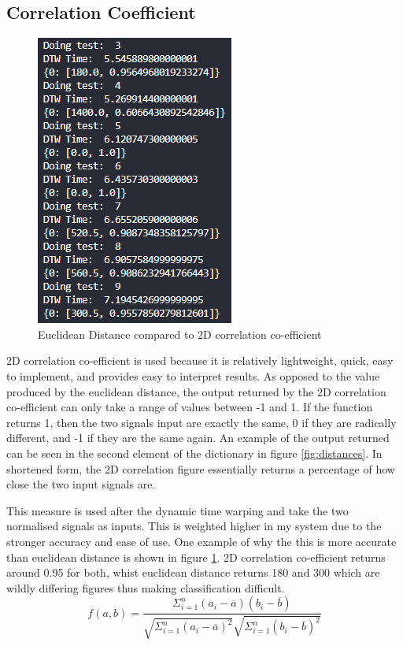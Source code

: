 \documentclass[10pt,a4paper]{report}
\begin{document}
\subsection{Correlation Coefficient}

\begin{figure}
	\centering
	\includegraphics[scale=0.5]{EucVs2D}
	\caption{Euclidean Distance compared to 2D correlation co-efficient}
	\label{fig:VCompare}
\end{figure}

2D correlation co-efficient is used because it is relatively lightweight, quick, easy to implement, and provides easy to interpret results. As opposed to the value produced by the euclidean distance, the output returned by the 2D correlation co-efficient can only take a range of values between -1 and 1. If the function returns 1, then the two signals input are exactly the same, 0 if they are radically different, and -1 if they are the same again. An example of the output returned can be seen in the second element of the dictionary in figure \ref{fig:distances}. In shortened form, the 2D correlation figure essentially returns a percentage of how close the two input signals are.

This measure is used after the dynamic time warping and take the two normalised signals as inputs. This is weighted higher in my system due to the stronger accuracy and ease of use. One example of why the this is more accurate than euclidean distance is shown in figure \ref{fig:VCompare}. 2D correlation co-efficient returns around 0.95 for both, whist euclidean distance returns 180 and 300 which are wildly differing figures thus making classification difficult.
\begin{equation}
	f(a,b) = \frac{\Sigma^n_{i=1}(a_i-\overline{a})(b_i - \overline{b})}{\sqrt{\Sigma^n_{i=1} (a_i-\overline{a})^2}\sqrt{\Sigma^n_{i=1}(b_i-\overline{b})^2}}
	\label{fig:corrco}
\end{equation}
\end{document}
